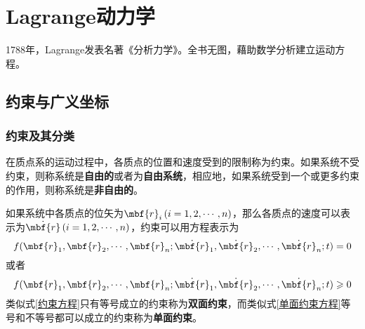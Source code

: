 \chapter{Lagrange动力学}

1788年，Lagrange发表名著《分析力学》。全书无图，藉助数学分析建立运动方程。

\section{约束与广义坐标}

\subsection{约束及其分类}

在质点系的运动过程中，各质点的位置和速度受到的限制称为{\heiti 约束}。如果系统不受约束，则称系统是{\bf 自由的}或者为{\bf 自由系统}，相应地，如果系统受到一个或更多约束的作用，则称系统是{\bf 非自由的}。

如果系统中各质点的位矢为$\mbf{r}_i\,(i=1,2,\cdots,n)$，那么各质点的速度可以表示为$\dot{\mbf{r}}\,(i=1,2,\cdots,n)$，约束可以用方程表示为
\begin{equation}
	f(\mbf{r}_1,\mbf{r}_2,\cdots,\mbf{r}_n;\dot{\mbf{r}}_1,\dot{\mbf{r}}_2,\cdots,\dot{\mbf{r}}_n;t) = 0
	\label{约束方程}
\end{equation}
或者
\begin{equation}
	f(\mbf{r}_1,\mbf{r}_2,\cdots,\mbf{r}_n;\dot{\mbf{r}}_1,\dot{\mbf{r}}_2,\cdots,\dot{\mbf{r}}_n;t) \geqslant 0
	\label{单面约束方程}
\end{equation}
类似式\eqref{约束方程}只有等号成立的约束称为{\bf 双面约束}，而类似式\eqref{单面约束方程}等号和不等号都可以成立的约束称为{\bf 单面约束}。

